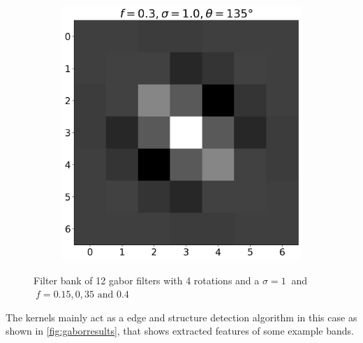 \documentclass[12pt,a4paper, english,twoside]{article}
\begin{document}
\begin{figure}[!htbp]
\begin{subfigure}[b]{0.3\textwidth}
      \end{subfigure}
      \begin{subfigure}[b]{0.3\textwidth}
        \includegraphics[width=\textwidth]{img/K11.png}
      \end{subfigure}
      \caption{Filter bank of 12 gabor filters with 4 rotations and a $\sigma=1\ $ and $\ f = 0.15, 0,35 \text{ and } 0.4$\label{fig:gaborbank}}%
    \end{figure}
%  
    \noindent
    The kernels mainly act as a edge and structure detection algorithm in this case as shown in \cref{fig:gaborresults}, that shows extracted features of some example bands.
\end{document}
